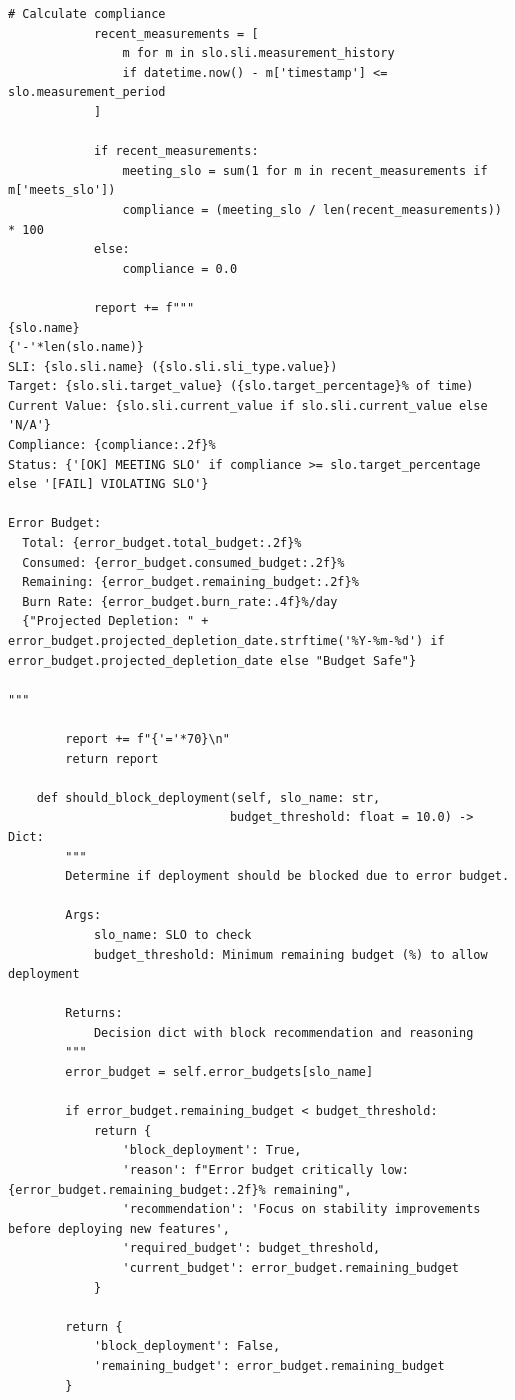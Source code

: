 \begin{lstlisting}[style=python, caption={SLIs and SLOs for ML systems}]
            # Calculate compliance
            recent_measurements = [
                m for m in slo.sli.measurement_history
                if datetime.now() - m['timestamp'] <= slo.measurement_period
            ]

            if recent_measurements:
                meeting_slo = sum(1 for m in recent_measurements if m['meets_slo'])
                compliance = (meeting_slo / len(recent_measurements)) * 100
            else:
                compliance = 0.0

            report += f"""
{slo.name}
{'-'*len(slo.name)}
SLI: {slo.sli.name} ({slo.sli.sli_type.value})
Target: {slo.sli.target_value} ({slo.target_percentage}% of time)
Current Value: {slo.sli.current_value if slo.sli.current_value else 'N/A'}
Compliance: {compliance:.2f}%
Status: {'[OK] MEETING SLO' if compliance >= slo.target_percentage else '[FAIL] VIOLATING SLO'}

Error Budget:
  Total: {error_budget.total_budget:.2f}%
  Consumed: {error_budget.consumed_budget:.2f}%
  Remaining: {error_budget.remaining_budget:.2f}%
  Burn Rate: {error_budget.burn_rate:.4f}%/day
  {"Projected Depletion: " + error_budget.projected_depletion_date.strftime('%Y-%m-%d') if error_budget.projected_depletion_date else "Budget Safe"}

"""

        report += f"{'='*70}\n"
        return report

    def should_block_deployment(self, slo_name: str,
                               budget_threshold: float = 10.0) -> Dict:
        """
        Determine if deployment should be blocked due to error budget.

        Args:
            slo_name: SLO to check
            budget_threshold: Minimum remaining budget (%) to allow deployment

        Returns:
            Decision dict with block recommendation and reasoning
        """
        error_budget = self.error_budgets[slo_name]

        if error_budget.remaining_budget < budget_threshold:
            return {
                'block_deployment': True,
                'reason': f"Error budget critically low: {error_budget.remaining_budget:.2f}% remaining",
                'recommendation': 'Focus on stability improvements before deploying new features',
                'required_budget': budget_threshold,
                'current_budget': error_budget.remaining_budget
            }

        return {
            'block_deployment': False,
            'remaining_budget': error_budget.remaining_budget
        }
\end{lstlisting}

